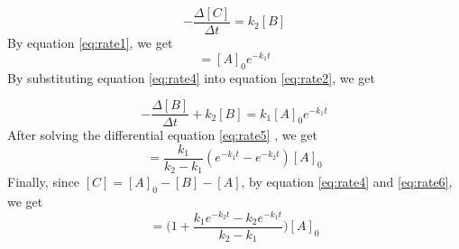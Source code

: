 \begin{equation}
- \frac{\Delta [C]}{\Delta t} = k_2 [B]
\label{eq:rate3}
\end{equation}
By equation \ref{eq:rate1}, we get
\begin{equation}
[A] = [A]_0 e^{-k_1 t}
\label{eq:rate4}
\end{equation}
By substituting equation \ref{eq:rate4} into equation \ref{eq:rate2}, we get

\begin{equation}
- \frac{\Delta [B]}{\Delta t} + k_2 [B] = k_1 [A]_0 e^{-k_1 t}
\label{eq:rate5}
\end{equation}
After solving the differential equation \ref{eq:rate5} , we get
\begin{equation}
[B] = \frac{k_1}{k_2 - k_1} (e^{-k_1 t} - e^{-k_2 t}) [A]_0
\label{eq:rate6}
\end{equation}
Finally, since $[C]=[A]_0 -[B]-[A]$, by equation \ref{eq:rate4} and \ref{eq:rate6}, we get
\begin{equation}
[C] = \Bigg( 1+ \frac{k_1 e^{-k_2 t} - k_2 e^{-k_1 t}}{k_2 - k_1} \Bigg) [A]_0
\label{eq:rate7}
\end{equation}
